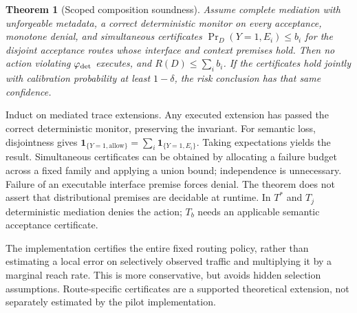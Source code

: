\documentclass[lettersize,journal]{IEEEtran}
\newtheorem{theorem}{Theorem}
\begin{document}
\begin{theorem}[Scoped composition soundness]
\label{thm:composition}
Assume complete mediation with unforgeable metadata, a correct deterministic
monitor on every acceptance, monotone denial, and simultaneous certificates
$\Pr_D(Y=1,E_i)\leq b_i$ for the disjoint acceptance routes whose interface and
context premises hold. Then no action violating $\varphi_{\rm det}$ executes,
and $R(D)\leq\sum_i b_i$. If the certificates hold jointly with calibration
probability at least $1-\delta$, the risk conclusion has that same confidence.
\end{theorem}
\begin{IEEEproof}
Induct on mediated trace extensions. Any executed extension has passed the
correct deterministic monitor, preserving the invariant. For semantic loss,
disjointness gives
$\mathbf{1}_{\{Y=1,\mathrm{allow}\}}=\sum_i\mathbf{1}_{\{Y=1,E_i\}}$.
Taking expectations yields the result. Simultaneous certificates can be
obtained by allocating a failure budget across a fixed family and applying a
union bound; independence is unnecessary. Failure of an executable interface
premise forces denial. The theorem does not assert that distributional
premises are decidable at runtime. In $T^*$ and $T_j$ deterministic mediation
denies the action; $T_b$ needs an applicable semantic acceptance certificate.
\end{IEEEproof}

The implementation certifies the entire fixed routing policy, rather than
estimating a local error on selectively observed traffic and multiplying it
by a marginal reach rate. This is more conservative, but avoids hidden
selection assumptions. Route-specific certificates are a supported theoretical
extension, not separately estimated by the pilot implementation.
\end{document}
